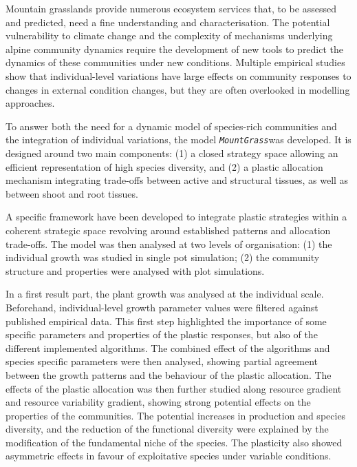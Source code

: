 \documentclass[a4paper, notoc, justified,marginals=left, nobib]{tufte-book}
\newcommand{\model}{\textit{\texttt{MountGrass}}}
\begin{document}
\begin{fullwidth}
Mountain grasslands provide numerous ecosystem services that, to be assessed and predicted, need a fine understanding and characterisation. The potential vulnerability to climate change and the complexity of mechanisms underlying alpine community dynamics require the development of new tools to predict the dynamics of these communities under new conditions. Multiple empirical studies show that individual-level variations have large effects on community responses to changes in external condition changes, but they are often overlooked in modelling approaches. %

To answer both the need for a dynamic model of species-rich communities and the integration of individual variations, the model \model was developed. It is designed around two main components: (1) a closed strategy space allowing an efficient representation of high species diversity, and (2) a plastic allocation mechanism integrating trade-offs between active and structural tissues, as well as between shoot and root tissues.

A specific framework have been developed to integrate plastic strategies within a coherent strategic space revolving around established patterns and allocation trade-offs. The model was then analysed at two levels of organisation: (1) the individual growth was studied in single pot simulation; (2) the community structure and properties were analysed with plot simulations.

In a first result part, the plant growth was analysed at the individual scale. Beforehand, individual-level growth parameter values were filtered against published empirical data. This first step highlighted the importance of some specific parameters and properties of the plastic responses, but also of the different implemented algorithms. The combined effect of the algorithms and species specific parameters were then analysed, showing partial agreement between the growth patterns and the behaviour of the plastic allocation. The effects of the plastic allocation was then further studied along resource gradient and resource variability gradient, showing strong potential effects on the properties of the communities. The potential increases in production and species diversity, and the reduction of the functional diversity were explained by the modification of the fundamental niche of the species. The plasticity also showed asymmetric effects in favour of exploitative species under variable conditions.


\end{fullwidth}
\end{document}
